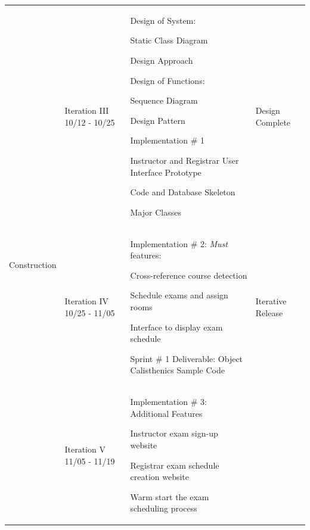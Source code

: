 \documentclass[11pt]{article}
\newenvironment{packed_itemize}{
\begin{itemize}
  \setlength{\itemsep}{1pt}
  \setlength{\parskip}{0pt}
  \setlength{\parsep}{0pt}
}{\end{itemize}}
\begin{document}
\begin{tabular}{|m{0.9in}|m{0.9in}|m{4in}|m{.8in}|}
\multirow{10}{*}{Construction }
 &
 Iteration III 10/12 - 10/25 & \vspace{0.1in}
 Design of System:
	\begin{packed_itemize}
		\vspace{-0.15in}
		\item Static Class Diagram
		\item Design Approach
	\end{packed_itemize}

 Design of Functions:
	\begin{packed_itemize}
		\vspace{-0.15in}
		\item Sequence Diagram
		\item  Design Pattern
	\end{packed_itemize}

 Implementation \# 1
	\begin{packed_itemize}
	\vspace{-0.15in}
	\item Instructor and Registrar User Interface Prototype
		\item Code and Database Skeleton
		\item Major Classes
	\vspace{-0.15in}
	\end{packed_itemize}
 & Design Complete \\  \cline{2-4}
&
 Iteration IV 10/25 - 11/05 & \vspace{0.1in}
 Implementation \# 2:
\emph{Must} features:
	\begin{packed_itemize}
	\vspace{-0.15in}
		\item Cross-reference course detection
		\item Schedule exams and assign rooms
		\item Interface to display exam schedule
	\end{packed_itemize}

{\raggedright
Sprint \# 1 Deliverable:
Object Calisthenics Sample Code }
 & Iterative Release \\  \cline{2-4}
 &
 Iteration V 11/05 - 11/19 & \vspace{0.1in}
 Implementation \# 3: Additional Features
	\begin{packed_itemize}
	\vspace{-0.15in}
		\item Instructor exam sign-up website
		\item Registrar exam schedule creation website
		\item Warm start the exam scheduling process
	\end{packed_itemize}


\end{tabular}
\end{document}
